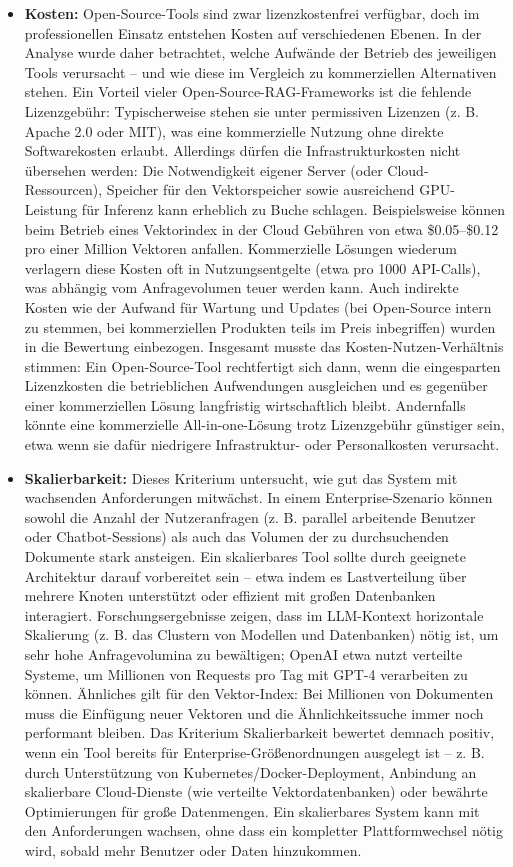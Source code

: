 \begin{itemize}
    \item \textbf{Kosten:} Open-Source-Tools sind zwar lizenzkostenfrei verfügbar, doch im professionellen Einsatz entstehen Kosten auf verschiedenen Ebenen. In der Analyse wurde daher betrachtet, welche Aufwände der Betrieb des jeweiligen Tools verursacht – und wie diese im Vergleich zu kommerziellen Alternativen stehen. Ein Vorteil vieler Open-Source-RAG-Frameworks ist die fehlende Lizenzgebühr: Typischerweise stehen sie unter permissiven Lizenzen (z. B. Apache 2.0 oder MIT), was eine kommerzielle Nutzung ohne direkte Softwarekosten erlaubt. Allerdings dürfen die Infrastrukturkosten nicht übersehen werden: Die Notwendigkeit eigener Server (oder Cloud-Ressourcen), Speicher für den Vektorspeicher sowie ausreichend GPU-Leistung für Inferenz kann erheblich zu Buche schlagen. Beispielsweise können beim Betrieb eines Vektorindex in der Cloud Gebühren von etwa \$0.05–\$0.12 pro einer Million Vektoren anfallen. Kommerzielle Lösungen wiederum verlagern diese Kosten oft in Nutzungsentgelte (etwa pro 1000 API-Calls), was abhängig vom Anfragevolumen teuer werden kann. Auch indirekte Kosten wie der Aufwand für Wartung und Updates (bei Open-Source intern zu stemmen, bei kommerziellen Produkten teils im Preis inbegriffen) wurden in die Bewertung einbezogen. Insgesamt musste das Kosten-Nutzen-Verhältnis stimmen: Ein Open-Source-Tool rechtfertigt sich dann, wenn die eingesparten Lizenzkosten die betrieblichen Aufwendungen ausgleichen und es gegenüber einer kommerziellen Lösung langfristig wirtschaftlich bleibt. Andernfalls könnte eine kommerzielle All-in-one-Lösung trotz Lizenzgebühr günstiger sein, etwa wenn sie dafür niedrigere Infrastruktur- oder Personalkosten verursacht.
    \item \textbf{Skalierbarkeit:} Dieses Kriterium untersucht, wie gut das System mit wachsenden Anforderungen mitwächst. In einem Enterprise-Szenario können sowohl die Anzahl der Nutzeranfragen (z. B. parallel arbeitende Benutzer oder Chatbot-Sessions) als auch das Volumen der zu durchsuchenden Dokumente stark ansteigen. Ein skalierbares Tool sollte durch geeignete Architektur darauf vorbereitet sein – etwa indem es Lastverteilung über mehrere Knoten unterstützt oder effizient mit großen Datenbanken interagiert. Forschungsergebnisse zeigen, dass im LLM-Kontext horizontale Skalierung (z. B. das Clustern von Modellen und Datenbanken) nötig ist, um sehr hohe Anfragevolumina zu bewältigen; OpenAI etwa nutzt verteilte Systeme, um Millionen von Requests pro Tag mit GPT-4 verarbeiten zu können. Ähnliches gilt für den Vektor-Index: Bei Millionen von Dokumenten muss die Einfügung neuer Vektoren und die Ähnlichkeitssuche immer noch performant bleiben. Das Kriterium Skalierbarkeit bewertet demnach positiv, wenn ein Tool bereits für Enterprise-Größenordnungen ausgelegt ist – z. B. durch Unterstützung von Kubernetes/Docker-Deployment, Anbindung an skalierbare Cloud-Dienste (wie verteilte Vektordatenbanken) oder bewährte Optimierungen für große Datenmengen. Ein skalierbares System kann mit den Anforderungen wachsen, ohne dass ein kompletter Plattformwechsel nötig wird, sobald mehr Benutzer oder Daten hinzukommen.

\end{itemize}
